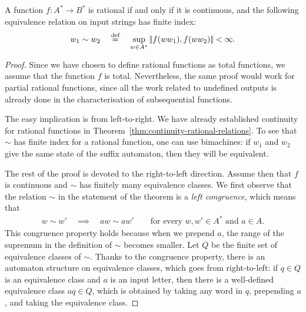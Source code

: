 \begin{theorem}\label{thm:machine-independent-rational-functions}
    A function $f : A^* \to B^*$ is rational if and only if it is continuous, and the following equivalence relation on input strings has finite index:
    \begin{align*}
w_1 \sim w_2 \quad \stackrel{\text{def}}= \quad  \sup_{w \in A^*} |\!| f(w w_1), f(w w_2) |\!| < \infty.
\end{align*}
\end{theorem}
\begin{proof}
    Since we have chosen to define rational functions as total functions, we assume that the function $f$ is total. Nevertheless, the same proof would work for partial rational functions, since all  the work related to undefined outputs is already done in the characterisation of subsequential functions.


    The easy implication is from left-to-right. We have already established continuity for rational functions in Theorem~\ref{thm:continuity-rational-relations}. To see that $\sim$ has finite index for a rational function, one can use bimachines: if $w_1$ and $w_2$ give the same state of the suffix automaton, then they will be equivalent. 
    
    The rest of the proof is devoted to the right-to-left direction. Assume then that $f$ is continuous and $\sim$ has finitely many equivalence classes. 
    We first observe that the relation  $\sim$ in the statement of the theorem  is a \emph{left congruence}, which means that 
\begin{align*}
w \sim w' \quad \implies \quad aw \sim aw' \qquad \text{for every $w,w' \in A^*$ and $a \in A$}.
\end{align*}
This congruence property holds because when we prepend $a$, the range of the supremum in the definition of $\sim$ becomes smaller. 
Let $Q$ be the finite set of equivalence classes of $\sim$.  Thanks to the congruence property, there is an automaton structure on equivalence classes, which goes from right-to-left: if $q \in Q$ is an equivalence class and $a$ is an input letter, then there is a well-defined equivalence class $aq \in Q$, which is obtained by taking any word in $q$, prepending $a$, and taking the equivalence class.


\end{proof}
